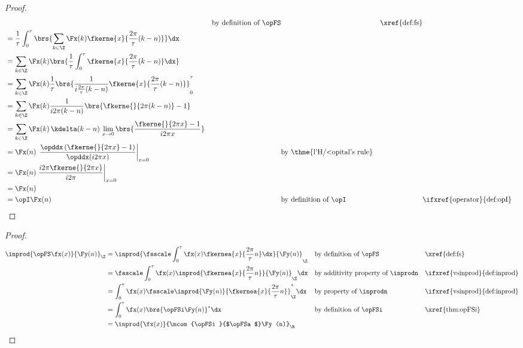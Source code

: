 \begin{proof}
\begin{align*}
       &&    \text{by definition of $\opFS$}
       &&    \text{\xref{def:fs}}
     \\&=    \frac{1}{\tau} \int_0^\tau \brs{ \sum_{k\in\Z} \Fx(k) \fkerne{x}{\frac{2\pi}{\tau}(k-n)}  }  \dx
     \\&=    \sum_{k\in\Z} \Fx(k) \brs{ \frac{1}{\tau}  \int_0^\tau \fkerne{x}{\frac{2\pi}{\tau}(k-n)} \dx }
     \\&=    \sum_{k\in\Z} \Fx(k) \frac{1}{\tau} \brs{  \frac{1}{i\frac{2\pi}{\tau}(k-n)}  \fkerne{x}{\frac{2\pi}{\tau}(k-n)}}_0^\tau
     \\&=    \sum_{k\in\Z} \Fx(k) \frac{1}{i2\pi(k-n)}\brs{ \fkerne{}{2\pi(k-n)}-1  }
     \\&=    \sum_{k\in\Z} \Fx(k) \, \kdelta(k-n)\, \lim_{x\to0}\brs{\frac{\fkerne{}{2\pi x}-1 }{i2\pi x}}
     \\&=    \Fx(n) \, \left.\frac{\opddx\left(\fkerne{}{2\pi x}-1\right) }{\opddx(i2\pi x)}\right|_{x=0}
       &&    \text{by \thme{l'H{/<o}pital's rule}}
     \\&=    \Fx(n) \left.\frac{i2\pi\fkerne{}{2\pi x}}{i2\pi }\right|_{x=0}
     \\&=    \Fx(n)
     \\&=    \opI \Fx(n)
       &&    \text{by definition of $\opI$}
       &&    \text{\ifxref{operator}{def:opI}}
\end{align*}
\end{proof}

\begin{theorem}
\label{thm:opFSa}
\end{theorem}
\begin{proof}
\begin{align*}
  \inprod{ \opFS \fx(x) }{ \Fy(n) }_{\Z}
    &= \inprod{ \fsscale \int_0^\tau \fx(x) \fkernea{x}{\frac{2\pi}{\tau}n} \dx }{ \Fy(n) }_{\Z}
    && \text{by definition of $\opFS$}
    && \text{\xref{def:fs}}
  \\&= \fsscale \int_0^\tau \fx(x) \inprod{ \fkernea{x}{\frac{2\pi}{\tau}n} }{ \Fy(n) }_{\Z}  \dx
    && \text{by additivity property of $\inprodn$}
    && \text{\ifxref{vsinprod}{def:inprod}}
  \\&= \int_0^\tau \fx(x) \fsscale \inprod{ \Fy(n) }{ \fkernea{x}{\frac{2\pi}{\tau}n} }_{\Z}^\ast  \dx
    && \text{by property of $\inprodn$}
    && \text{\ifxref{vsinprod}{def:inprod}}
  \\&= \int_0^\tau \fx(x) \brs{\opFSi\Fy(n)}^\ast  \dx
    && \text{by definition of $\opFSi$}
    && \text{\xref{thm:opFSi}}
  \\&= \inprod{\fx(x)}{\mcom{\opFSi}{$\opFSa$}\Fy(n)}_{\R}
\end{align*}
\end{proof}

